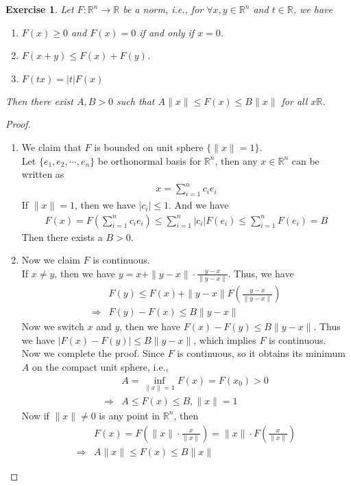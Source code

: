 \documentclass[12pt,leqno]{amsart}
\newtheorem{exercise}{Exercise}[section]
\theoremstyle{definition}
\numberwithin{equation}{subsection}
\begin{document}
\begin{exercise}
Let $F:\mathbb{R}^n\to\mathbb{R}$ be a norm, i.e., for $\forall x,y\in \mathbb{R}^n$ and $t\in\mathbb{R}$, we have
\begin{enumerate}
    \item $F(x)\geq 0$ and $F(x) = 0$ if and only if $x = 0$.
    \item $F(x+y)\leq F(x) + F(y)$.
    \item $F(tx) = |t|F(x)$
\end{enumerate}
Then there exist $A,B > 0$ such that $A\|x\|\leq F(x)\leq B\|x\|$ for all $x\mathbb{R}$.
\end{exercise}
\begin{proof}
~\begin{enumerate}
    \item We claim that $F$ is bounded on unit sphere $\{\|x\| = 1\}$. \\
    Let $\{e_1,e_2,\cdots,e_n\}$ be orthonormal basis for $\mathbb{R}^n$, then any $x\in\mathbb{R}^n$ can be written as
    \begin{align*}
        x = \sum^n_{i=1} c_ie_i
    \end{align*}
    If $\|x\| = 1$, then we have $|c_i| \leq 1$. And we have 
    \begin{align*}
        F(x) = F\left(\sum^n_{i=1} c_ie_i\right) \leq \sum^n_{i=1} |c_i| F(e_i) \leq \sum^n_{i=1} F(e_i) = B
    \end{align*}
    Then there exists a $B > 0$.
    \item Now we claim $F$ is continuous. \\
    If $x \neq y$, then we have $y = x + \|y-x\|\cdot \frac{y-x}{\|y-x\|}$. Thus, we have
    \begin{align*}
        & F(y) \leq F(x) + \|y-x\| F \left(\frac{y-x}{\|y-x\|}\right) \\
        \Rightarrow & F(y) - F(x) \leq B\|y-x\|
    \end{align*}
    Now we switch $x$ and $y$, then we have $F(x) - F(y) \leq B\|y-x\|$. Thus we have $|F(x) - F(y)|\leq B \|y-x\|$, which implies $F$ is continuous. \\

    Now we complete the proof. Since $F$ is continuous, so it obtains its minimum $A$ on the compact unit sphere, i.e.,
    \begin{align*}
        & A = \inf_{\|x\| = 1}F(x) = F(x_0) > 0 \\
        \Rightarrow & A\leq F(x) \leq B, \|x\| = 1
    \end{align*}
    Now if $\|x\|\neq 0$ is any point in $\mathbb{R}^n$, then 
    \begin{align*}
        & F(x) = F\left(\|x\|\cdot\frac{x}{\|x\|}\right) = \|x\|\cdot F\left(\frac{x}{\|x\|}\right) \\
        \Rightarrow & A\|x\|\leq F(x)\leq B\|x\|
    \end{align*}
\end{enumerate}
\end{proof}
\end{document}
